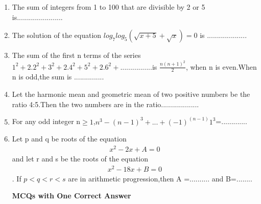 \renewcommand{\theequation}{\theenumi}
\begin{enumerate}[label=\arabic*.,ref=\thesubsection.\theenumi]
    \item The sum of integers from 1 to 100 that are divisible by 2 or 5 is....................... 
     \item The solution of the equation $log_7 log_5(\sqrt{x+5}+\sqrt{x})=0$ is ....................
     \item The sum of the first n terms of the series $1^2+2.2^2+3^2+2.4^2+5^2+2.6^2+................$is $\frac{n(n+1)^2}{2}$, when n is even.When n is odd,the sum is ...............
     \item Let the harmonic mean and geometric mean of two positive numbers be the ratio 4:5.Then the two numbers are in the ratio...................
     \item For any odd integer n$\geq1$,$n^3-(n-1)^3+...+(-1)^{(n-1)} 1^3$=.............
     \item Let p and q be roots of the equation 
     \begin{align}
     x^2-2x+A=0
     \end{align} and let r and s be the roots of the equation 
     \begin{align}
     x^2-18x+B=0
     \end{align}. If $p<q<r<s$ are in arithmetic progression,then A =.......... and B=........

 \textbf{ MCQs with One Correct Answer}
 

\end{enumerate}
